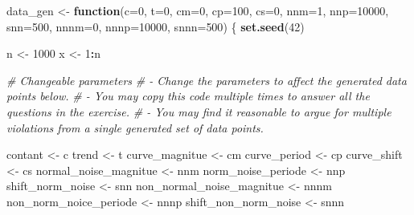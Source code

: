 \documentclass[
]{article}
\newenvironment{Shaded}{\begin{snugshade}}{\end{snugshade}}
\newcommand{\AttributeTok}[1]{\textcolor[rgb]{0.13,0.29,0.53}{#1}}
\newcommand{\CommentTok}[1]{\textcolor[rgb]{0.56,0.35,0.01}{\textit{#1}}}
\newcommand{\ControlFlowTok}[1]{\textcolor[rgb]{0.13,0.29,0.53}{\textbf{#1}}}
\newcommand{\DecValTok}[1]{\textcolor[rgb]{0.00,0.00,0.81}{#1}}
\newcommand{\FunctionTok}[1]{\textcolor[rgb]{0.13,0.29,0.53}{\textbf{#1}}}
\newcommand{\NormalTok}[1]{#1}
\newcommand{\OtherTok}[1]{\textcolor[rgb]{0.56,0.35,0.01}{#1}}
\newcommand{\SpecialCharTok}[1]{\textcolor[rgb]{0.81,0.36,0.00}{\textbf{#1}}}
\begin{document}
\begin{Shaded}
\begin{Highlighting}[]
\NormalTok{data\_gen }\OtherTok{\textless{}{-}} \ControlFlowTok{function}\NormalTok{(}\AttributeTok{c=}\DecValTok{0}\NormalTok{, }\AttributeTok{t=}\DecValTok{0}\NormalTok{, }\AttributeTok{cm=}\DecValTok{0}\NormalTok{, }\AttributeTok{cp=}\DecValTok{100}\NormalTok{, }\AttributeTok{cs=}\DecValTok{0}\NormalTok{, }\AttributeTok{nnm=}\DecValTok{1}\NormalTok{, }\AttributeTok{nnp=}\DecValTok{10000}\NormalTok{, }\AttributeTok{snn=}\DecValTok{500}\NormalTok{, }\AttributeTok{nnnm=}\DecValTok{0}\NormalTok{, }\AttributeTok{nnnp=}\DecValTok{10000}\NormalTok{, }\AttributeTok{snnn=}\DecValTok{500}\NormalTok{) \{}
  \FunctionTok{set.seed}\NormalTok{(}\DecValTok{42}\NormalTok{)}
  
\NormalTok{  n }\OtherTok{\textless{}{-}} \DecValTok{1000}
\NormalTok{  x }\OtherTok{\textless{}{-}} \DecValTok{1}\SpecialCharTok{:}\NormalTok{n}
  
  \CommentTok{\# Changeable parameters}
  \CommentTok{\# {-} Change the parameters to affect the generated data points below.}
  \CommentTok{\# {-} You may copy this code multiple times to answer all the questions in the exercise.}
  \CommentTok{\# {-} You may find it reasonable to argue for multiple violations from a single generated set of data points.}
  
\NormalTok{  contant }\OtherTok{\textless{}{-}}\NormalTok{ c }
\NormalTok{  trend }\OtherTok{\textless{}{-}}\NormalTok{ t}
\NormalTok{  curve\_magnitue }\OtherTok{\textless{}{-}}\NormalTok{ cm}
\NormalTok{  curve\_period }\OtherTok{\textless{}{-}}\NormalTok{ cp}
\NormalTok{  curve\_shift }\OtherTok{\textless{}{-}}\NormalTok{ cs}
\NormalTok{  normal\_noise\_magnitue }\OtherTok{\textless{}{-}}\NormalTok{ nnm}
\NormalTok{  norm\_noise\_periode }\OtherTok{\textless{}{-}}\NormalTok{ nnp}
\NormalTok{  shift\_norm\_noise }\OtherTok{\textless{}{-}}\NormalTok{ snn}
\NormalTok{  non\_normal\_noise\_magnitue }\OtherTok{\textless{}{-}}\NormalTok{ nnnm}
\NormalTok{  non\_norm\_noice\_periode }\OtherTok{\textless{}{-}}\NormalTok{ nnnp}
\NormalTok{  shift\_non\_norm\_noise }\OtherTok{\textless{}{-}}\NormalTok{ snnn}
  

\end{Highlighting}
\end{Shaded}
\end{document}
